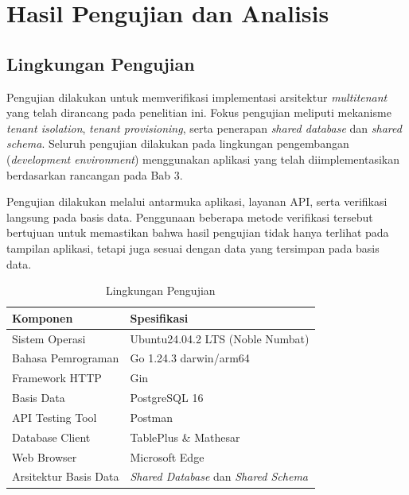\chapter{Hasil Pengujian dan Analisis}

\section{Lingkungan Pengujian}

Pengujian dilakukan untuk memverifikasi implementasi arsitektur \textit{multitenant} yang telah dirancang pada penelitian ini. Fokus pengujian meliputi mekanisme \textit{tenant isolation}, \textit{tenant provisioning}, serta penerapan \textit{shared database} dan \textit{shared schema}. Seluruh pengujian dilakukan pada lingkungan pengembangan (\textit{development environment}) menggunakan aplikasi yang telah diimplementasikan berdasarkan rancangan pada Bab 3.

Pengujian dilakukan melalui antarmuka aplikasi, layanan API, serta verifikasi langsung pada basis data. Penggunaan beberapa metode verifikasi tersebut bertujuan untuk memastikan bahwa hasil pengujian tidak hanya terlihat pada tampilan aplikasi, tetapi juga sesuai dengan data yang tersimpan pada basis data.

\begin{table}[H]
  \centering
  \caption{Lingkungan Pengujian}
  \label{tab:lingkungan_pengujian}
  \begin{tabular}{|p{5cm}|p{8cm}|}
    \hline
    \rowcolor[HTML]{EFEFEF}
    \textbf{Komponen} & \textbf{Spesifikasi} \\
    \hline
    Sistem Operasi & Ubuntu24.04.2 LTS (Noble Numbat) \\
    \hline
    Bahasa Pemrograman & Go 1.24.3 darwin/arm64 \\
    \hline
    Framework HTTP & Gin \\
    \hline
    Basis Data & PostgreSQL 16 \\
    \hline
    API Testing Tool & Postman \\
    \hline
    Database Client & TablePlus \& Mathesar \\
    \hline
    Web Browser & Microsoft Edge \\
    \hline
    Arsitektur Basis Data & \textit{Shared Database} dan \textit{Shared Schema} \\
    \hline
  \end{tabular}
\end{table}

